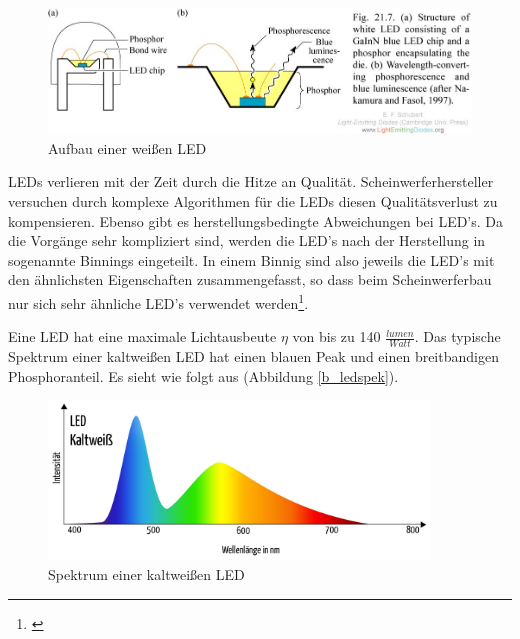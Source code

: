 \begin{figure}[htp]     %
\centering
\includegraphics[width=1.0\textwidth]{bilder/ledw} 
\caption {Aufbau einer weißen LED\protect\footnotemark}\label{b_ledw}
\end{figure}

\noindent LEDs verlieren mit der Zeit durch die Hitze an Qualität. Scheinwerferhersteller versuchen durch komplexe Algorithmen für die LEDs diesen Qualitätsverlust zu kompensieren. Ebenso gibt es herstellungsbedingte Abweichungen bei LED's. Da die Vorgänge sehr kompliziert sind, werden die LED's nach der Herstellung in sogenannte Binnings eingeteilt. In einem Binnig sind also jeweils die LED's mit den ähnlichsten Eigenschaften zusammengefasst, so dass beim Scheinwerferbau nur sich sehr ähnliche LED's verwendet werden\footnote{\cite[153]{mueller}}.

\noindent Eine LED hat eine maximale Lichtausbeute $\eta$ von bis zu 140 $\frac{lumen}{Watt}$. Das typische Spektrum einer kaltweißen LED hat einen blauen Peak und einen breitbandigen Phosphoranteil. Es sieht wie folgt aus (Abbildung \ref{b_ledspek}).

\begin{figure}[htp]     %
\centering
\includegraphics[width=0.9\textwidth]{bilder/ledspek} 
\caption {Spektrum einer kaltweißen LED\protect\footnotemark}\label{b_ledw}
\end{figure}


